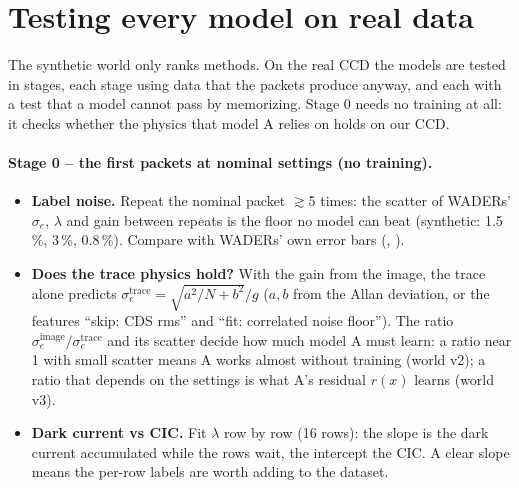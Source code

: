 \section{Testing every model on real data}
\label{sec:realtest}

\begin{basic}
The synthetic world only ranks methods. On the real CCD the models are tested in stages, each stage using data that the packets
produce anyway, and each with a test that a model cannot pass by memorizing. Stage 0 needs no training at all: it checks whether the
physics that model A relies on holds on our CCD.
\end{basic}

\paragraph{Stage 0 -- the first packets at nominal settings (no training).}
\begin{itemize}
\item \textbf{Label noise.} Repeat the nominal packet $\gtrsim$5 times: the scatter of WADERs' $\sigma_e$, $\lambda$ and gain between repeats is the
  floor no model can beat (synthetic: 1.5\,\%, 3\,\%, 0.8\,\%). Compare with WADERs' own error bars (, ).
\item \textbf{Does the trace physics hold?} With the gain from the image, the trace alone predicts
  $\sigma_e^\text{trace} = \sqrt{a^2/N + b^2}/g$ ($a, b$ from the Allan deviation, or the features ``skip: CDS rms'' and
  ``fit: correlated noise floor''). The ratio $\sigma_e^\text{image}/\sigma_e^\text{trace}$ and its scatter decide how much model A must
  learn: a ratio near 1 with small scatter means A works almost without training (world v2); a ratio that depends on the settings
  is what A's residual $r(x)$ learns (world v3).
\item \textbf{Dark current vs CIC.} Fit $\lambda$ row by row (16 rows): the slope is the dark current accumulated while the rows wait, the
  intercept the CIC. A clear slope means the per-row labels are worth adding to the dataset.
\end{itemize}


